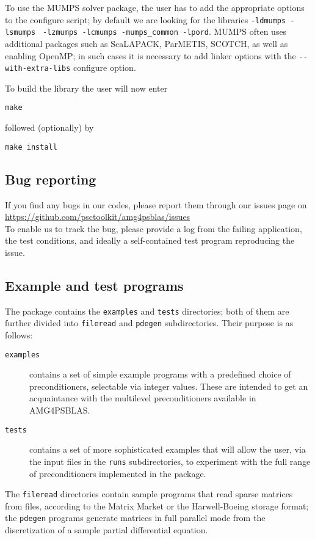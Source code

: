 To use the MUMPS solver package,
the user has to add the appropriate options to the configure script;
by default we are looking for the libraries
\verb|-ldmumps -lsmumps| \verb| -lzmumps -lcmumps -mumps_common -lpord|.
MUMPS often uses additional packages such as ScaLAPACK, ParMETIS,
SCOTCH, as well as enabling OpenMP; in such cases it is necessary to
add linker options with the \verb|--with-extra-libs| configure option.

To build the library the user will now enter
\begin{verbatim}
make
\end{verbatim}
followed (optionally) by
\begin{verbatim}
make install
\end{verbatim}
\subsection{Bug reporting}
If you find any bugs in our codes, please report them through our
issues page on \\[2mm]
\url{https://github.com/psctoolkit/amg4psblas/issues}\\

To enable us to track the bug, please provide a log from the failing
application, the test conditions, and ideally a self-contained test
program reproducing the issue.

\subsection{Example and test programs\label{sec:ex_and_test}}
The package contains the \verb|examples| and \verb|tests| directories;
both of them are further divided into \verb|fileread| and
\verb|pdegen| subdirectories. Their purpose is as follows:
\begin{description}
\item[\tt examples] contains a set of simple example programs with a
  predefined choice of preconditioners, selectable via integer
  values. These are intended to get an acquaintance with the
  multilevel preconditioners available in AMG4PSBLAS.
\item[\tt tests] contains a set of more sophisticated examples that
  will allow the user, via the input files in the \verb|runs|
  subdirectories, to experiment with the full range of preconditioners
  implemented in the package.
\end{description}
The \verb|fileread| directories contain sample programs that read
sparse matrices from files, according to the Matrix Market or the
Harwell-Boeing storage format; the \verb|pdegen| programs generate
matrices in full parallel mode from the discretization of a sample partial
differential equation.
